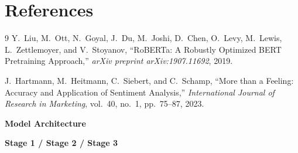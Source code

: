 \documentclass[10pt,twocolumn]{article}
\begin{document}
\section*{References}
\begingroup
\renewcommand{\section}[2]{}
\begin{thebibliography}{9}
\small
{}
Y.~Liu, M.~Ott, N.~Goyal, J.~Du, M.~Joshi, D.~Chen, O.~Levy,
M.~Lewis, L.~Zettlemoyer, and V.~Stoyanov,
``RoBERTa: A Robustly Optimized BERT Pretraining Approach,''
\textit{arXiv preprint arXiv:1907.11692}, 2019.

J.~Hartmann, M.~Heitmann, C.~Siebert, and C.~Schamp,
``More than a Feeling: Accuracy and Application of Sentiment Analysis,''
\textit{International Journal of Research in Marketing},
vol.~40, no.~1, pp.~75--87, 2023.
\end{thebibliography}
\endgroup

\appendix

\section{EXP01 Full Hyperparameter Settings}

\noindent\textbf{Model Architecture}

\vspace{3pt}
\noindent{}

\vspace{6pt}
\noindent\textbf{Stage 1 / Stage 2 / Stage 3}
\end{document}
